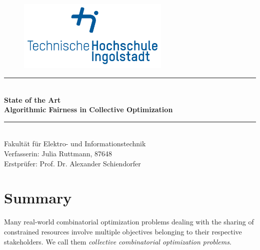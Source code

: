 \documentclass[german, a4paper, 11pt, oneside]{scrbook}
\begin{document}
\thispagestyle{empty}
\begin{figure}[t]
 \centering
 \includegraphics[height=3.4cm, trim=1.2cm 1.2cm 1.2cm 1.2cm]{thi_logo}
\end{figure}
\begin{center}
\vspace*{2cm}

\vspace*{2cm}
\par\noindent\rule{\textwidth}{0.2pt}
\\
\vspace*{0.5cm}
{\huge \textbf{State of the Art}}\\
{\LARGE \textbf{Algorithmic Fairness in Collective Optimization}}
\par\noindent\rule{\textwidth}{0.2pt}
\\
\vspace*{2cm}
{\huge Fakultät für Elektro- und Informationstechnik}
\\
\vspace*{2cm}
{\LARGE Verfasserin: Julia Ruttmann, 87648\\Erstprüfer: Prof. Dr. Alexander Schiendorfer\\}

\end{center}
\newpage
\tableofcontents
\thispagestyle{empty}
\newpage
\setcounter{page}{1}
\chapter{Summary}
Many real-world combinatorial optimization problems dealing with the sharing of constrained resources involve multiple objectives belonging to their respective stakeholders. We call them \emph{collective combinatorial optimization problems}. 
\end{document}
